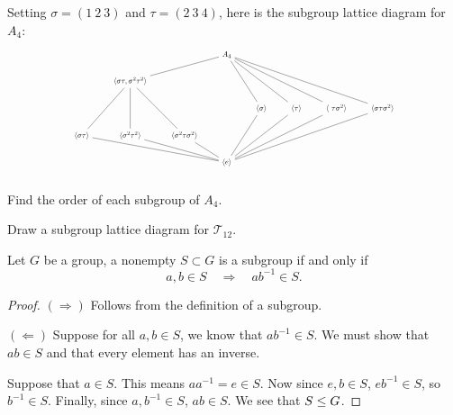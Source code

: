 \documentclass{ximera}
\begin{document}
\begin{example}
  Setting $\sigma = (1 \ 2 \ 3)$ and $\tau = (2 \ 3 \ 4)$, here is the
  subgroup lattice diagram for $A_4$:
  \[
  \begin{tikzpicture}
  \node[scale=.6] at (0,0) {\begin{tikzcd}
                   &   & & A_4   \ar[lld,-] \ar[rdd,-] \ar[rrdd,-]  \ar[rrrdd,-]  \ar[rrrrdd,-]   & &  & &        \\
                   & \<\sigma\tau, \sigma^2\tau^2\> \ar[ldd,-] \ar[dd,-] \ar[rdd,-] &  &              & &  & &  \\
                   &                                  &            &   & \<\sigma\> \ar[ldd,-]& \<\tau\> \ar[lldd,-] & \<\ \tau\sigma^2\> \ar[llldd,-]& \< \sigma \tau\sigma^2 \>\ar[lllldd,-]       \\
   \<\sigma\tau\>\ar[drrr,-]  & \<\sigma^2\tau^2\> \ar[drr,-] & \<\sigma^2\tau\sigma^2\> \ar[dr,-]& & &  & &    \\
                   &                               &   & \< e\>       & & & &  
  \end{tikzcd}};
  \end{tikzpicture}
  \]
\end{example}


\begin{exercise}
  Find the order of each subgroup of $A_4$.
\end{exercise}

\begin{exercise}
  Draw a subgroup lattice diagram for $\mathcal{T}_{12}$.
\end{exercise}


\begin{theorem}\label{T:sc}
  Let $G$ be a group, a nonempty $S\subset G$ is a subgroup if and
  only if
  \[
  a,b\in S \quad \Rightarrow \quad ab^{-1}\in S.
  \]
  \begin{proof}
    $(\Rightarrow)$ Follows from the definition of a subgroup.

    $(\Leftarrow)$ Suppose for all $a,b\in S$, we know that
    $ab^{-1}\in S$. We must show that $ab\in S$ and that every element
    has an inverse.

    Suppose that $a\in S$. This means $aa^{-1} = e\in S$.  Now since
    $e,b\in S$, $eb^{-1}\in S$, so $b^{-1}\in S$.  Finally, since
    $a,b^{-1}\in S$, $ab\in S$. We see that $S\leq G$.
  \end{proof}
\end{theorem}
\end{document}
